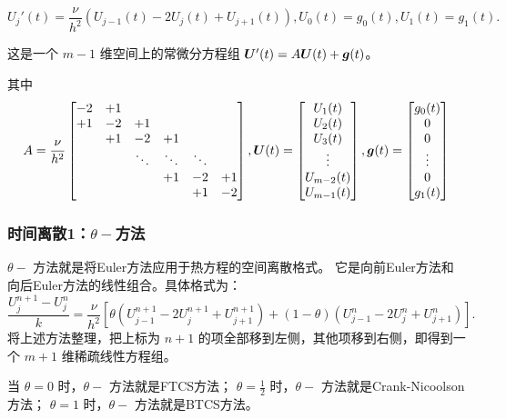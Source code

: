 \documentclass[lang=cn,a4paper,newtx,bibend=bibtex]{elegantpaper}
\begin{document}
\begin{equation}
    U_j'(t) = \frac{\nu}{h^2}(U_{j-1}(t) - 2U_j(t) + U_{j+1}(t)), U_0(t) = g_0(t), U_1(t) = g_1(t).
\end{equation}

这是一个 $m-1$ 维空间上的常微分方程组 $\bm{U}'(t) = A\bm{U}(t) + \bm{g}(t)$。

其中
\begin{equation}
    A=\frac {\nu}{h^2}
    \begin{bmatrix} 
        -2 & +1 & & & & \\
        +1 & -2 & +1 & & & \\
        & +1 & -2 & +1 & & \\
        & & \ddots & \ddots & \ddots & \\
        & & & +1 & -2 & +1 \\
        & & & & +1 & -2 \\
     \end{bmatrix},
    \bm{U}(t) = \begin{bmatrix} 
        U_1(t) \\
        U_2(t) \\
        U_3(t) \\
        \vdots \\
        U_{m-2}(t) \\
        U_{m-1}(t) \\
     \end{bmatrix},
    \bm{g}(t) = \begin{bmatrix} 
        g_0(t) \\
        0 \\
        0 \\
        \vdots \\
        0 \\
        g_1(t) \\
     \end{bmatrix}
\end{equation}

\subsubsection{时间离散1：$\theta-$方法}

$\theta-$ 方法就是将Euler方法应用于热方程的空间离散格式。
它是向前Euler方法和向后Euler方法的线性组合。具体格式为：
\begin{equation}
    \dfrac{U_j^{n+1}-U_j^n}k = \dfrac{\nu}{h^2}[\theta(U_{j-1}^{n+1}-2U_j^{n+1}+U_{j+1}^{n+1})+(1-\theta)(U_{j-1}^n-2U_j^n+U_{j+1}^n)].
\end{equation}
将上述方法整理，把上标为 $n+1$ 的项全部移到左侧，其他项移到右侧，即得到一个 $m+1$ 维稀疏线性方程组。

当 $\theta=0$ 时，$\theta-$ 方法就是FTCS方法；
$\theta=\frac 12$ 时，$\theta-$ 方法就是Crank-Nicoolson方法；
$\theta=1$ 时，$\theta-$ 方法就是BTCS方法。
\end{document}
